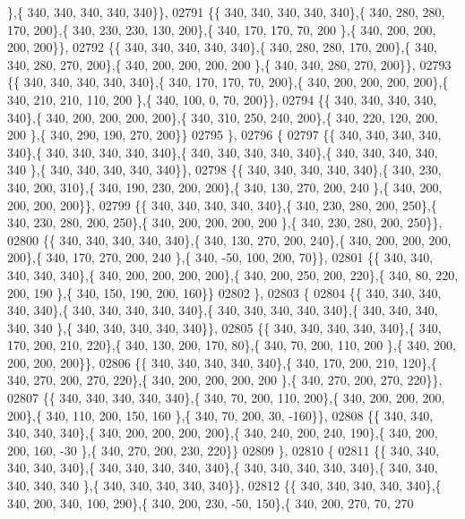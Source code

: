 \begin{DoxyCode}
      \},\{ 340, 340, 340, 340, 340\}\},
02791 \{\{ 340, 340, 340, 340, 340\},\{ 340, 280, 280, 170, 200\},\{ 340, 230, 230, 130, 200\},\{ 340, 170, 170,  70, 200
      \},\{ 340, 200, 200, 200, 200\}\},
02792 \{\{ 340, 340, 340, 340, 340\},\{ 340, 280, 280, 170, 200\},\{ 340, 340, 280, 270, 200\},\{ 340, 200, 200, 200, 200
      \},\{ 340, 340, 280, 270, 200\}\},
02793 \{\{ 340, 340, 340, 340, 340\},\{ 340, 170, 170,  70, 200\},\{ 340, 200, 200, 200, 200\},\{ 340, 210, 210, 110, 200
      \},\{ 340, 100,   0,  70, 200\}\},
02794 \{\{ 340, 340, 340, 340, 340\},\{ 340, 200, 200, 200, 200\},\{ 340, 310, 250, 240, 200\},\{ 340, 220, 120, 200, 200
      \},\{ 340, 290, 190, 270, 200\}\}
02795 \},
02796 \{
02797 \{\{ 340, 340, 340, 340, 340\},\{ 340, 340, 340, 340, 340\},\{ 340, 340, 340, 340, 340\},\{ 340, 340, 340, 340, 340
      \},\{ 340, 340, 340, 340, 340\}\},
02798 \{\{ 340, 340, 340, 340, 340\},\{ 340, 230, 340, 200, 310\},\{ 340, 190, 230, 200, 200\},\{ 340, 130, 270, 200, 240
      \},\{ 340, 200, 200, 200, 200\}\},
02799 \{\{ 340, 340, 340, 340, 340\},\{ 340, 230, 280, 200, 250\},\{ 340, 230, 280, 200, 250\},\{ 340, 200, 200, 200, 200
      \},\{ 340, 230, 280, 200, 250\}\},
02800 \{\{ 340, 340, 340, 340, 340\},\{ 340, 130, 270, 200, 240\},\{ 340, 200, 200, 200, 200\},\{ 340, 170, 270, 200, 240
      \},\{ 340, -50, 100, 200,  70\}\},
02801 \{\{ 340, 340, 340, 340, 340\},\{ 340, 200, 200, 200, 200\},\{ 340, 200, 250, 200, 220\},\{ 340,  80, 220, 200, 190
      \},\{ 340, 150, 190, 200, 160\}\}
02802 \},
02803 \{
02804 \{\{ 340, 340, 340, 340, 340\},\{ 340, 340, 340, 340, 340\},\{ 340, 340, 340, 340, 340\},\{ 340, 340, 340, 340, 340
      \},\{ 340, 340, 340, 340, 340\}\},
02805 \{\{ 340, 340, 340, 340, 340\},\{ 340, 170, 200, 210, 220\},\{ 340, 130, 200, 170,  80\},\{ 340,  70, 200, 110, 200
      \},\{ 340, 200, 200, 200, 200\}\},
02806 \{\{ 340, 340, 340, 340, 340\},\{ 340, 170, 200, 210, 120\},\{ 340, 270, 200, 270, 220\},\{ 340, 200, 200, 200, 200
      \},\{ 340, 270, 200, 270, 220\}\},
02807 \{\{ 340, 340, 340, 340, 340\},\{ 340,  70, 200, 110, 200\},\{ 340, 200, 200, 200, 200\},\{ 340, 110, 200, 150, 160
      \},\{ 340,  70, 200,  30, -160\}\},
02808 \{\{ 340, 340, 340, 340, 340\},\{ 340, 200, 200, 200, 200\},\{ 340, 240, 200, 240, 190\},\{ 340, 200, 200, 160, -30
      \},\{ 340, 270, 200, 230, 220\}\}
02809 \},
02810 \{
02811 \{\{ 340, 340, 340, 340, 340\},\{ 340, 340, 340, 340, 340\},\{ 340, 340, 340, 340, 340\},\{ 340, 340, 340, 340, 340
      \},\{ 340, 340, 340, 340, 340\}\},
02812 \{\{ 340, 340, 340, 340, 340\},\{ 340, 200, 340, 100, 290\},\{ 340, 200, 230, -50, 150\},\{ 340, 200, 270,  70, 270

\end{DoxyCode}
